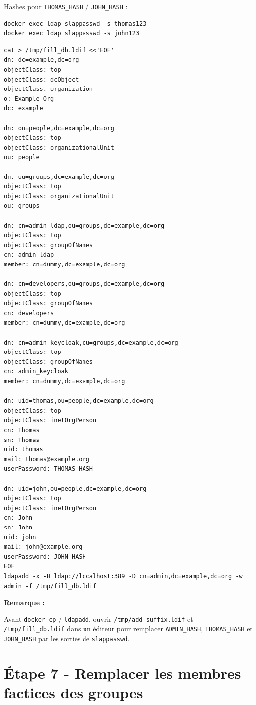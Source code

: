 \documentclass[11pt,a4paper]{report}
\newenvironment{nota}{%
  \par\medskip\noindent
  \begin{lrbox}{\notabox}%
  \begin{minipage}{0.97\linewidth}%
  \small
  \textbf{Remarque :}~%
}{%
  \end{minipage}%
  \end{lrbox}%
  {\setlength{\fboxsep}{6pt}%
   \fcolorbox{black!15}{black!3}{\usebox{\notabox}}}%
  \par\medskip
}
\begin{document}
Hashes pour \texttt{THOMAS\_HASH} / \texttt{JOHN\_HASH} :

\begin{lstlisting}[style=bashstyle]
docker exec ldap slappasswd -s thomas123
docker exec ldap slappasswd -s john123
\end{lstlisting}

\begin{lstlisting}[style=bashstyle]
cat > /tmp/fill_db.ldif <<'EOF'
dn: dc=example,dc=org
objectClass: top
objectClass: dcObject
objectClass: organization
o: Example Org
dc: example

dn: ou=people,dc=example,dc=org
objectClass: top
objectClass: organizationalUnit
ou: people

dn: ou=groups,dc=example,dc=org
objectClass: top
objectClass: organizationalUnit
ou: groups

dn: cn=admin_ldap,ou=groups,dc=example,dc=org
objectClass: top
objectClass: groupOfNames
cn: admin_ldap
member: cn=dummy,dc=example,dc=org

dn: cn=developers,ou=groups,dc=example,dc=org
objectClass: top
objectClass: groupOfNames
cn: developers
member: cn=dummy,dc=example,dc=org

dn: cn=admin_keycloak,ou=groups,dc=example,dc=org
objectClass: top
objectClass: groupOfNames
cn: admin_keycloak
member: cn=dummy,dc=example,dc=org

dn: uid=thomas,ou=people,dc=example,dc=org
objectClass: top
objectClass: inetOrgPerson
cn: Thomas
sn: Thomas
uid: thomas
mail: thomas@example.org
userPassword: THOMAS_HASH

dn: uid=john,ou=people,dc=example,dc=org
objectClass: top
objectClass: inetOrgPerson
cn: John
sn: John
uid: john
mail: john@example.org
userPassword: JOHN_HASH
EOF
ldapadd -x -H ldap://localhost:389 -D cn=admin,dc=example,dc=org -w admin -f /tmp/fill_db.ldif
\end{lstlisting}

\begin{nota}
Avant \texttt{docker cp} / \texttt{ldapadd}, ouvrir \texttt{/tmp/add\_suffix.ldif} et \texttt{/tmp/fill\_db.ldif} dans un éditeur pour remplacer \texttt{ADMIN\_HASH}, \texttt{THOMAS\_HASH} et \texttt{JOHN\_HASH} par les sorties de \texttt{slappasswd}.
\end{nota}

\section{Étape 7 - Remplacer les membres factices des groupes}
\end{document}
